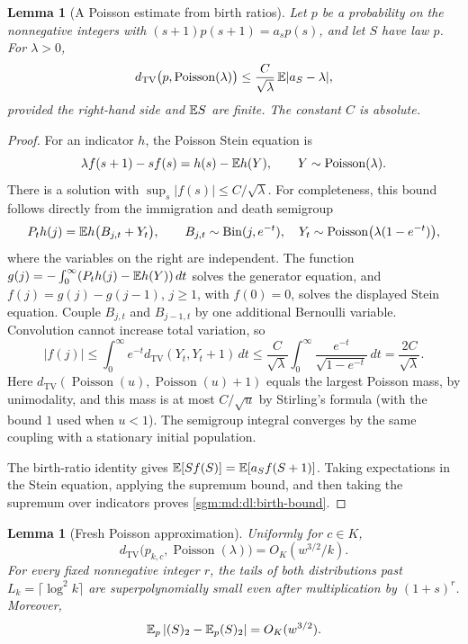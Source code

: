 \documentclass[11pt,letterpaper]{article}
\newtheorem{lemma}[theorem]{Lemma}\newtheorem{proposition}[theorem]{Proposition}\newtheorem{corollary}[theorem]{Corollary}
\theoremstyle{remark}\newtheorem{remark}[theorem]{Remark}
\newcommand{\Poi}{\operatorname{Poisson}}\newcommand{\Bin}{\operatorname{Bin}}
\newcommand{\fall}[2]{(#1)_{#2}}\newcommand{\rise}[2]{#1^{\overline{#2}}}
\theoremstyle{definition}\newtheorem{definition}[theorem]{Definition}
\newcommand{\TV}{d_{\mathrm{TV}}}
\begin{document}
\begin{lemma}[A Poisson estimate from birth ratios]
\label{sgm:md:dl:stein}
Let $p$ be a probability on the nonnegative integers with
$(s+1)p(s+1)=a_s p(s)$, and let $S$ have law $p$.
For $\lambda>0$,
\begin{equation}\label{sgm:md:dl:birth-bound}
 \TV\bigl(p,\Poi(\lambda)\bigr)
 \le \frac{C}{\sqrt\lambda}\,
                    \E|a_S-\lambda|,
\end{equation}
provided the right-hand side and $\mathbb E S$ are finite.  The constant $C$ is
absolute.
\end{lemma}

\begin{proof}
For an indicator $h$, the Poisson Stein equation is
\[
 \lambda f(s+1)-sf(s)=h(s)-\E h(Y),
 \qquad Y\sim\Poi(\lambda).
\]
There is a solution with $\sup_s|f(s)|\le C/\sqrt\lambda$.
For completeness, this bound follows directly from the immigration and
death semigroup
\[
 P_t h(j)=\E h\bigl(B_{j,t}+Y_t\bigr),\qquad
 B_{j,t}\sim\operatorname{Bin}(j,e^{-t}),\quad
 Y_t\sim\Poi\bigl(\lambda(1-e^{-t})\bigr),
\]
where the variables on the right are independent.
The function
$g(j)=-\int_0^\infty(P_t h(j)-\mathbb E h(Y))\,dt$ solves the generator equation,
and $f(j)=g(j)-g(j-1)$, $j\ge1$, with $f(0)=0$, solves the displayed
Stein equation.
Couple $B_{j,t}$ and $B_{j-1,t}$ by one additional Bernoulli variable.
Convolution cannot increase total variation, so
\[
 |f(j)|\le
 \int_0^\infty e^{-t}
   \TV(Y_t,Y_t+1)\,dt
 \le \frac{C}{\sqrt\lambda}
       \int_0^\infty\frac{e^{-t}}{\sqrt{1-e^{-t}}}\,dt
 =\frac{2C}{\sqrt\lambda}.
\]
Here $\TV(\Poi(u),\Poi(u)+1)$ equals the largest Poisson mass, by
unimodality, and this mass is at most $C/\sqrt u$ by Stirling's formula
(with the bound $1$ used when $u<1$).  The semigroup integral converges by
the same coupling with a stationary initial population.

The birth-ratio identity gives
$\mathbb E[Sf(S)]=\mathbb E[a_Sf(S+1)]$.
Taking expectations in the Stein equation, applying the supremum bound,
and then taking the supremum over indicators proves
\eqref{sgm:md:dl:birth-bound}.
\end{proof}

\begin{lemma}[Fresh Poisson approximation]
\label{sgm:md:dl:fresh-poisson}
Uniformly for $c\in K$,
\begin{equation}\label{sgm:md:dl:fresh-tv}
 \TV\bigl(p_{k,c},\Poi(\lambda)\bigr)
                 =O_K(w^{3/2}/k).
\end{equation}
For every fixed nonnegative integer $r$, the tails of both distributions
past $L_k=\lceil\log^2k\rceil$ are superpolynomially small even after
multiplication by $(1+s)^r$.  Moreover,
\begin{equation}\label{sgm:md:dl:centered-factorial}
 \E_p\left|\fall{S}{2}-\E_p\fall{S}{2}\right|
                         =O_K(w^{3/2}).
\end{equation}
\end{lemma}
\end{document}
